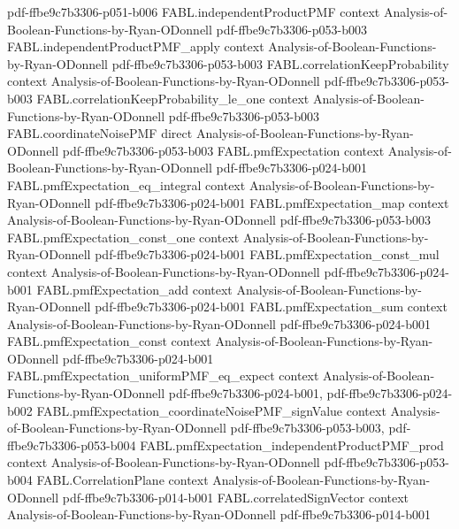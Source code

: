 \begin{theorem}
  {pdf-ffbe9c7b3306-p051-b006}
\proofstep
  {FABL.independentProductPMF}
  {context}
  {Analysis-of-Boolean-Functions-by-Ryan-ODonnell}
  {pdf-ffbe9c7b3306-p053-b003}
\proofstep
  {FABL.independentProductPMF_apply}
  {context}
  {Analysis-of-Boolean-Functions-by-Ryan-ODonnell}
  {pdf-ffbe9c7b3306-p053-b003}
\proofstep
  {FABL.correlationKeepProbability}
  {context}
  {Analysis-of-Boolean-Functions-by-Ryan-ODonnell}
  {pdf-ffbe9c7b3306-p053-b003}
\proofstep
  {FABL.correlationKeepProbability_le_one}
  {context}
  {Analysis-of-Boolean-Functions-by-Ryan-ODonnell}
  {pdf-ffbe9c7b3306-p053-b003}
\proofstep
  {FABL.coordinateNoisePMF}
  {direct}
  {Analysis-of-Boolean-Functions-by-Ryan-ODonnell}
  {pdf-ffbe9c7b3306-p053-b003}
\proofstep
  {FABL.pmfExpectation}
  {context}
  {Analysis-of-Boolean-Functions-by-Ryan-ODonnell}
  {pdf-ffbe9c7b3306-p024-b001}
\proofstep
  {FABL.pmfExpectation_eq_integral}
  {context}
  {Analysis-of-Boolean-Functions-by-Ryan-ODonnell}
  {pdf-ffbe9c7b3306-p024-b001}
\proofstep
  {FABL.pmfExpectation_map}
  {context}
  {Analysis-of-Boolean-Functions-by-Ryan-ODonnell}
  {pdf-ffbe9c7b3306-p053-b003}
\proofstep
  {FABL.pmfExpectation_const_one}
  {context}
  {Analysis-of-Boolean-Functions-by-Ryan-ODonnell}
  {pdf-ffbe9c7b3306-p024-b001}
\proofstep
  {FABL.pmfExpectation_const_mul}
  {context}
  {Analysis-of-Boolean-Functions-by-Ryan-ODonnell}
  {pdf-ffbe9c7b3306-p024-b001}
\proofstep
  {FABL.pmfExpectation_add}
  {context}
  {Analysis-of-Boolean-Functions-by-Ryan-ODonnell}
  {pdf-ffbe9c7b3306-p024-b001}
\proofstep
  {FABL.pmfExpectation_sum}
  {context}
  {Analysis-of-Boolean-Functions-by-Ryan-ODonnell}
  {pdf-ffbe9c7b3306-p024-b001}
\proofstep
  {FABL.pmfExpectation_const}
  {context}
  {Analysis-of-Boolean-Functions-by-Ryan-ODonnell}
  {pdf-ffbe9c7b3306-p024-b001}
\proofstep
  {FABL.pmfExpectation_uniformPMF_eq_expect}
  {context}
  {Analysis-of-Boolean-Functions-by-Ryan-ODonnell}
  {pdf-ffbe9c7b3306-p024-b001,
    pdf-ffbe9c7b3306-p024-b002}
\proofstep
  {FABL.pmfExpectation_coordinateNoisePMF_signValue}
  {context}
  {Analysis-of-Boolean-Functions-by-Ryan-ODonnell}
  {pdf-ffbe9c7b3306-p053-b003,
    pdf-ffbe9c7b3306-p053-b004}
\proofstep
  {FABL.pmfExpectation_independentProductPMF_prod}
  {context}
  {Analysis-of-Boolean-Functions-by-Ryan-ODonnell}
  {pdf-ffbe9c7b3306-p053-b004}
\proofstep
  {FABL.CorrelationPlane}
  {context}
  {Analysis-of-Boolean-Functions-by-Ryan-ODonnell}
  {pdf-ffbe9c7b3306-p014-b001}
\proofstep
  {FABL.correlatedSignVector}
  {context}
  {Analysis-of-Boolean-Functions-by-Ryan-ODonnell}
  {pdf-ffbe9c7b3306-p014-b001}

\end{theorem}
